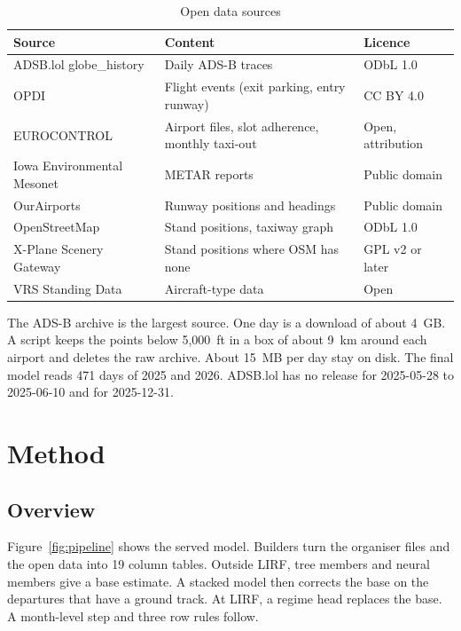 \documentclass[
  manuscript=article,
  layout=preprint,
  year=2026,
  volume=x,
]{extra/joas}
\begin{document}
\begin{table}[htbp!]
  \centering
  \small
  \caption{Open data sources}
  \label{tb:sources}
  \begin{tabular}{lll}
  \toprule
  \textbf{Source} & \textbf{Content} & \textbf{Licence} \\
  \midrule
  ADSB.lol globe\_history \cite{adsblol} & Daily ADS-B traces & ODbL 1.0 \\
  OPDI \cite{opdi} & Flight events (exit parking, entry runway) & CC BY 4.0 \\
  EUROCONTROL \cite{eurocontrolperf} & Airport files, slot adherence, monthly taxi-out & Open, attribution \\
  Iowa Environmental Mesonet \cite{iemasos} & METAR reports & Public domain \\
  OurAirports \cite{ourairports} & Runway positions and headings & Public domain \\
  OpenStreetMap \cite{osm} & Stand positions, taxiway graph & ODbL 1.0 \\
  X-Plane Scenery Gateway \cite{xplanegateway} & Stand positions where OSM has none & GPL v2 or later \\
  VRS Standing Data \cite{vrsstanding} & Aircraft-type data & Open \\
  \bottomrule
  \end{tabular}
\end{table}

The ADS-B archive is the largest source. One day is a download of about 4~GB. A script keeps the points below 5,000~ft in a box of about 9~km around each airport and deletes the raw archive. About 15~MB per day stay on disk. The final model reads 471 days of 2025 and 2026. ADSB.lol has no release for 2025-05-28 to 2025-06-10 and for 2025-12-31.


\section{Method}
\label{sec:method}

\subsection{Overview}

Figure~\ref{fig:pipeline} shows the served model. Builders turn the organiser files and the open data into 19 column tables. Outside LIRF, tree members and neural members give a base estimate. A stacked model then corrects the base on the departures that have a ground track. At LIRF, a regime head replaces the base. A month-level step and three row rules follow.
\end{document}
